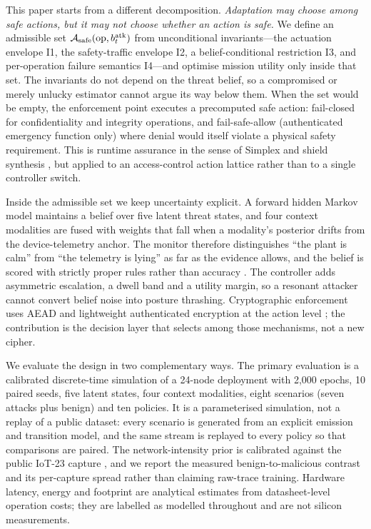 This paper starts from a different decomposition. \emph{Adaptation may choose
among safe actions, but it may not choose whether an action is safe.} We define
an admissible set $\mathcal{A}_{\mathrm{safe}}(\mathrm{op},b^{\mathrm{atk}}_t)$ from unconditional invariants---the
actuation envelope I1, the safety-traffic envelope I2, a belief-conditional
restriction I3, and per-operation failure semantics I4---and optimise mission
utility only inside that set. The invariants do not depend on the threat belief,
so a compromised or merely unlucky estimator cannot argue its way below them.
When the set would be empty, the enforcement point executes a precomputed safe
action: fail-closed for confidentiality and integrity operations, and
fail-safe-allow (authenticated emergency function only) where denial would
itself violate a physical safety requirement. This is runtime assurance in the
sense of Simplex and shield synthesis \cite{sha2001simplicity,wu2017safety,wu2019shield,mehmood2022black,cho2025timed},
but applied to an access-control action lattice rather than to a single
controller switch.

Inside the admissible set we keep uncertainty explicit. A forward hidden Markov
model maintains a belief over five latent threat states, and four context
modalities are fused with weights that fall when a modality's posterior drifts
from the device-telemetry anchor. The monitor therefore distinguishes ``the
plant is calm'' from ``the telemetry is lying'' as far as the evidence allows,
and the belief is scored with strictly proper rules rather than accuracy
\cite{guo2017calibration,gneiting2007strictly}. The controller adds asymmetric
escalation, a dwell band and a utility margin, so a resonant attacker cannot
convert belief noise into posture thrashing. Cryptographic enforcement uses
AEAD and lightweight authenticated encryption at the action level
\cite{dobraunig2021ascon,cagua2025implementation}; the contribution is the
decision layer that selects among those mechanisms, not a new cipher.

We evaluate the design in two complementary ways. The primary evaluation is a
calibrated discrete-time simulation of a 24-node deployment with 2{,}000 epochs,
10 paired seeds, five latent states, four context modalities, eight scenarios
(seven attacks plus benign) and ten policies. It is a parameterised simulation,
not a replay of a public dataset: every scenario is generated from an explicit
emission and transition model, and the same stream is replayed to every policy
so that comparisons are paired. The network-intensity prior is calibrated
against the public IoT-23 capture \cite{garcia2020iot}, and we report the
measured benign-to-malicious contrast and its per-capture spread rather than
claiming raw-trace training. Hardware latency, energy and footprint are analytical
estimates from datasheet-level operation costs; they are labelled as modelled
throughout and are not silicon measurements.

